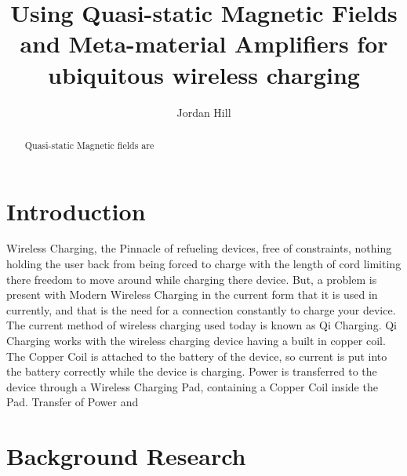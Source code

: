 \documentclass[]{article}
\title{Using Quasi-static Magnetic Fields and Meta-material Amplifiers for ubiquitous wireless charging}
\author{Jordan Hill}
\begin{document}
\maketitle

\begin{abstract}
Quasi-static Magnetic fields are 
\end{abstract}

\section{Introduction}
Wireless Charging, the Pinnacle of refueling devices, free of constraints, nothing holding the user back from being forced to charge with the length of cord limiting there freedom to move around while charging there device. But, a problem is present with Modern Wireless Charging in the current form that it is used in currently, and that is the need for a connection constantly to charge your device. The current method of wireless charging used today is known as Qi Charging. Qi Charging works with the wireless charging device having a built in copper coil. The Copper Coil is attached to the battery of the device, so current is put into the battery correctly while the device is charging. Power is transferred to the device through a Wireless Charging Pad, containing a Copper Coil inside the Pad. Transfer of Power and 
\section{Background Research}
\end{document}
